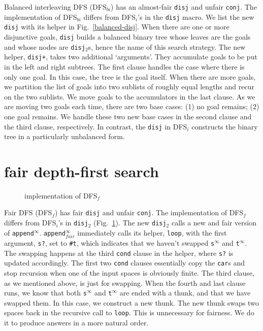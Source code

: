 \documentclass[format=acmlarge, review=true, authordraft=true]{acmart}
\newcommand{\conj}{\texttt{conj}}
\newcommand{\disj}{\texttt{disj}}
\newcommand{\disjtwo}{\texttt{disj$_2$}}
\newcommand{\DFSi }[0]{DFS$_{i}$}
\newcommand{\DFSf }[0]{DFS$_{f}$}
\newcommand{\DFSbi}[0]{DFS$_{bi}$}
\begin{document}
Balanced interleaving DFS (\DFSbi{}) has an almost-fair \disj{} and unfair 
\conj{}. The implementation of \DFSbi{} differs from 
\DFSi{}'s in the \disj{} macro. We list the new \disj{} with its 
helper in Fig.~\ref{balanced-disj}. When there are one or more disjunctive 
goals, \disj{} builds a balanced binary tree whose leaves are the goals and 
whose nodes are \disjtwo{}s, hence the name of this search strategy. 
The new helper, \texttt{disj+}, takes two additional `arguments'. They 
accumulate goals to be put in the left and right subtrees. The first clause 
handles the case where there is only one goal. In this case, the tree is the 
goal itself. When there are more goals, we partition the list of goals 
into two sublists of roughly equal lengths and recur on the two sublists. We 
move goals to the accumulators in the last clause. As we are moving 
two goals each time, there are two base cases: (1) no goal remains; (2) one 
goal remains. We handle these two new base cases in the second clause and the 
third clause, respectively. In contrast, the \disj{} in \DFSi{} constructs the 
binary tree in a particularly unbalanced form.

\section{fair depth-first search}

\begin{figure}
	
	\caption{implementation of \DFSf{}}
	\label{fDFS}
\end{figure}

Fair DFS (\DFSf) has fair \disj{} and unfair \conj{}. The 
implementation of \DFSf{} differs from \DFSi{}'s in 
\disjtwo{} (Fig.~\ref{fDFS}). The new \disjtwo{} calls a new and 
fair version of \texttt{append$^\infty$}. \texttt{append$^\infty_{fair}$} 
immediately 
calls 
its helper, \texttt{loop}, with the first argument, \texttt{s?}, set to 
\texttt{\#{}t}, which indicates that we haven't swapped
\texttt{s$^\infty$} and \texttt{t$^\infty$}. The swapping 
happens at 
the third \texttt{cond} clause in the helper, where \texttt{s?} is updated 
accordingly. The first two \texttt{cond} clauses essentially copy the 
\texttt{car}s and stop recursion when one of the input spaces is obviously 
finite. The third clause, as we mentioned above, is just for swapping. When the 
fourth and last clause runs, we know that both \texttt{s$^\infty$} and 
\texttt{t$^\infty$} are ended with a thunk, and that we have swapped them. In 
this case, we construct a new thunk. The new thunk swaps two spaces back in the
recursive call to \texttt{loop}. This is unnecessary for fairness. We do it to 
produce answers in a more natural order.
\end{document}
